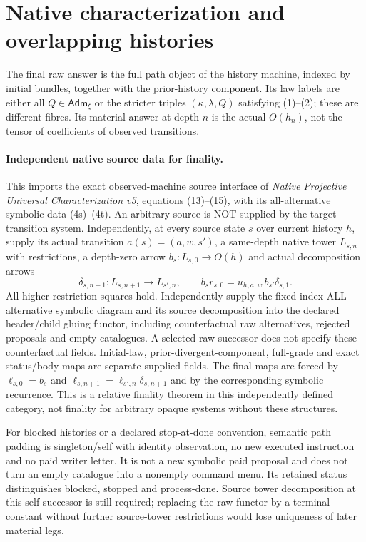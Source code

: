 \documentclass{article}
\begin{document}
\section{Native characterization and overlapping histories}
The final raw answer is the full path object of the history machine, indexed by initial bundles, together with the prior-history component. Its law labels are either all $Q\in\mathsf{Adm}_\xi$ or the stricter triples $(\kappa,\lambda,Q)$ satisfying (1)--(2); these are different fibres. Its material answer at depth $n$ is the actual $O(h_n)$, not the tensor of coefficients of observed transitions.

\paragraph{Independent native source data for finality.}
This imports the exact observed-machine source interface of \emph{Native Projective Universal Characterization v5}, equations (13)--(15), with its all-alternative symbolic data (4s)--(4t). An arbitrary source is NOT supplied by the target transition system. Independently, at every source state $s$ over current history $h$, supply its actual transition $a(s)=(a,w,s')$, a same-depth native tower $L_{s,n}$ with restrictions, a depth-zero arrow $b_s:L_{s,0}\to O(h)$ and actual decomposition arrows
\[
 \delta_{s,n+1}:L_{s,n+1}\longrightarrow L_{s',n},\qquad
 b_s r_{s,0}=u_{h,a,w}\,b_{s'}\delta_{s,1}.
\]
All higher restriction squares hold. Independently supply the fixed-index ALL-alternative symbolic diagram and its source decomposition into the declared header/child gluing functor, including counterfactual raw alternatives, rejected proposals and empty catalogues. A selected raw successor does not specify these counterfactual fields. Initial-law, prior-divergent-component, full-grade and exact status/body maps are separate supplied fields. The final maps are forced by $\ell_{s,0}=b_s$ and $\ell_{s,n+1}=\ell_{s',n}\delta_{s,n+1}$ and by the corresponding symbolic recurrence. This is a relative finality theorem in this independently defined category, not finality for arbitrary opaque systems without these structures.

For blocked histories or a declared stop-at-done convention, semantic path padding is singleton/self with identity observation, no new executed instruction and no paid writer letter. It is not a new symbolic paid proposal and does not turn an empty catalogue into a nonempty command menu. Its retained status distinguishes blocked, stopped and process-done. Source tower decomposition at this self-successor is still required; replacing the raw functor by a terminal constant without further source-tower restrictions would lose uniqueness of later material legs.
\end{document}
